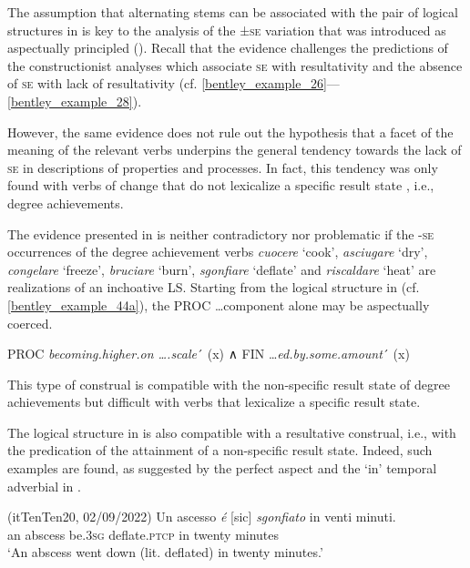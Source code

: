 \documentclass[output=paper,colorlinks,citecolor=brown
]{langscibook}
\begin{document}
The assumption that alternating stems can be associated with the pair of logical structures in  is key to the analysis of the ±\textsc{se} variation that was introduced as aspectually principled (). Recall that the evidence challenges the predictions of the constructionist analyses which associate \textsc{se} with resultativity and the absence of \textsc{se} with lack of resultativity (cf. \ref{bentley_example_26}—\ref{bentley_example_28}). 

However, the same evidence does not rule out the hypothesis that a facet of the meaning of the relevant verbs underpins the general tendency towards the lack of \textsc{se} in descriptions of properties and processes. In fact, this tendency was only found with verbs of change that do not lexicalize a specific result state \citep{cennamo2012aspectual}, i.e., degree achievements. 

The evidence presented in  is neither contradictory nor problematic if the -\textsc{se} occurrences of the degree achievement verbs \textit{cuocere} ‘cook’, \textit{asciugare} ‘dry’, \textit{congelare} ‘freeze’, \textit{bruciare} ‘burn’, \textit{sgonfiare} ‘deflate’ and \textit{riscaldare} ‘heat’ are realizations of an inchoative LS. Starting from the logical structure in  (cf. \ref{bentley_example_44a}), the PROC \ldots  component alone may be aspectually coerced. 

\ea \label{bentley_example_48}
    PROC \textit{becoming.higher.on \ldots .scale}´ (x) ∧ FIN  \ldots \textit{ed.by.some.amount}´ (x)
\z

This type of construal is compatible with the non-specific result state of degree achievements but difficult with verbs that lexicalize a specific result state. 

The logical structure in  is also compatible with a resultative construal, i.e., with the predication of the attainment of a non-specific result state. Indeed, such examples are found, as suggested by the perfect aspect and the ‘in’ temporal adverbial in .


\hspace*{\fill}(itTenTen20, 02/09/2022)\quad
\ea \label{bentley_example_49}
    \gll Un ascesso	{\textit{é} [sic]} 		\textit{sgonfiato}				in venti 			minuti. \\
    an	abscess be.3\textsc{sg}		deflate.\textsc{ptcp}		in	twenty		minutes \\
    \glt ‘An abscess went down (lit. deflated) in twenty minutes.’
\z
\end{document}
